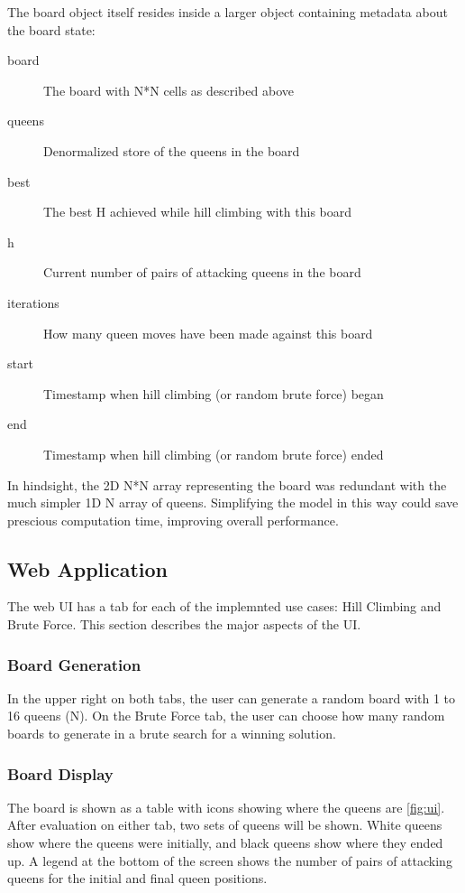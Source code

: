 The board object itself resides inside a larger object containing metadata about the board state:

\begin{description}
\item[board] The board with N*N cells as described above
\item[queens] Denormalized store of the queens in the board
\item[best] The best H achieved while hill climbing with this board
\item[h] Current number of pairs of attacking queens in the board
\item[iterations] How many queen moves have been made against this board
\item[start] Timestamp when hill climbing (or random brute force)  began
\item[end] Timestamp when hill climbing (or random brute force) ended
\end{description}

In hindsight, the 2D N*N array representing the board was redundant with the much simpler 1D N array of queens.
Simplifying the model in this way could save prescious computation time, improving overall performance.

\subsection{Web Application}
The web UI has a tab for each of the implemnted use cases: Hill Climbing and Brute Force. This section describes the
major aspects of the UI.

\subsubsection{Board Generation}
In the upper right on both tabs, the user can generate a random board with 1 to 16 queens (N). On the Brute Force tab,
the user can choose how many random boards to generate in a brute search for a winning solution.

\subsubsection{Board Display}
The board is shown as a table with icons showing where the queens are \ref{fig:ui}. After evaluation on either tab, two sets of
queens will be shown. White queens show where the queens were initially, and black queens show where they ended up.
A legend at the bottom of the screen shows the number of pairs of attacking queens for the initial and final queen
positions.

